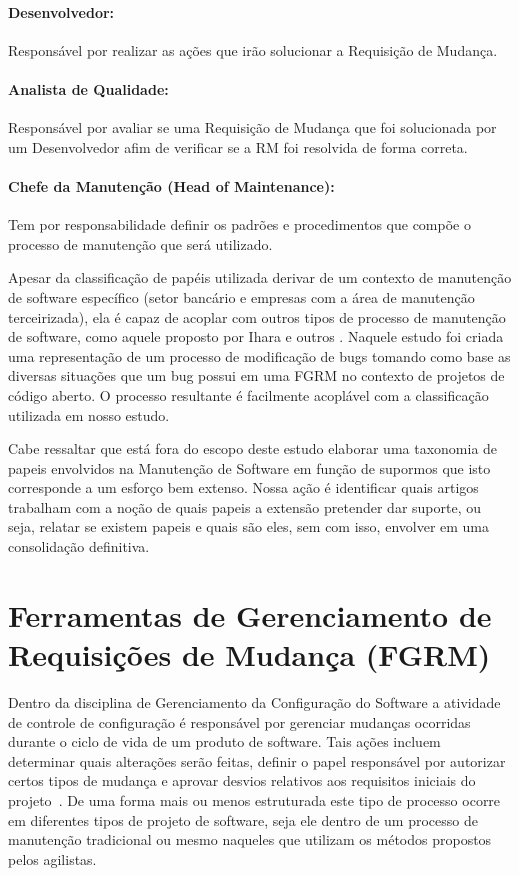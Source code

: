 \paragraph{Desenvolvedor:}
Responsável por realizar as ações que irão solucionar a Requisição de Mudança.

\paragraph{Analista de Qualidade:}
Responsável por avaliar se uma Requisição de Mudança que foi solucionada por um
Desenvolvedor afim de verificar se a RM foi resolvida de forma correta.

\paragraph{Chefe da Manutenção (Head of	Maintenance):}
Tem por responsabilidade definir os padrões e procedimentos que compõe o
processo de manutenção que será utilizado.

Apesar da classificação de papéis utilizada derivar de um contexto de manutenção
de software específico (setor bancário e empresas com a área de manutenção
terceirizada), ela é capaz de acoplar com outros tipos de processo de manutenção
de software, como aquele proposto por Ihara e outros
\cite{Ihara:2009:AMI:1595808.1595833}. Naquele estudo foi criada uma
representação de um processo de modificação de bugs tomando como base as
diversas situações que um bug possui em uma FGRM no contexto de projetos de
código aberto. O processo resultante é facilmente acoplável com a classificação
utilizada em nosso estudo.

Cabe ressaltar que está fora do escopo deste estudo elaborar uma taxonomia de
papeis envolvidos na Manutenção de Software em função de supormos que isto
corresponde a um esforço bem extenso. Nossa ação é identificar quais artigos
trabalham com a noção de quais papeis a extensão pretender dar suporte, ou seja,
relatar se existem papeis e quais são eles, sem com isso, envolver em uma
consolidação definitiva.
\todoend

\section{Ferramentas de Gerenciamento de Requisições de Mudança (FGRM)}
\label{sec:ferramentas_de_gerenciamento_requisicoes_de_mudanca}

Dentro da disciplina de Gerenciamento da Configuração do Software a atividade de
controle de configuração é responsável por gerenciar mudanças ocorridas durante
o ciclo de vida de um produto de software. Tais ações incluem determinar quais
alterações serão feitas, definir o papel responsável por autorizar certos tipos
de mudança e aprovar desvios relativos aos requisitos iniciais do
projeto~\cite{4425813}. De uma forma mais ou menos estruturada este tipo de
processo ocorre em diferentes tipos de projeto de software, seja ele dentro de
um processo de manutenção tradicional ou mesmo naqueles que utilizam os métodos
propostos pelos agilistas.

